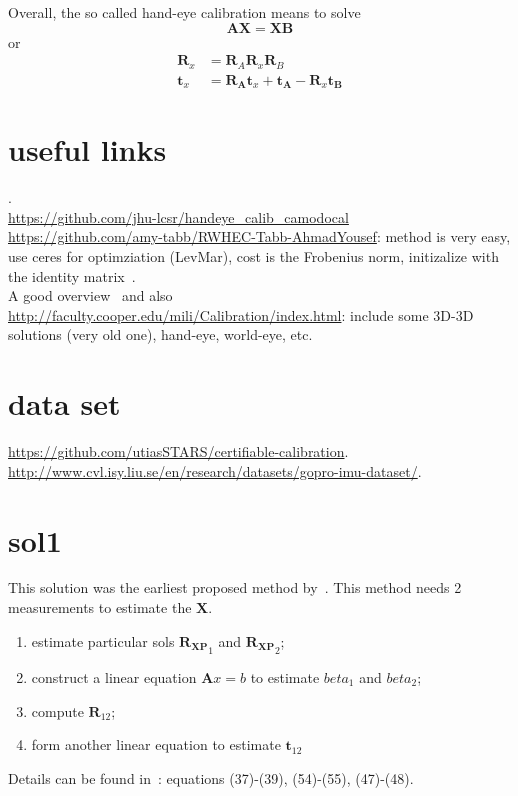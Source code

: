 \documentclass[a4paper]{report}
\begin{document}
Overall, the so called hand-eye calibration means to solve 
\begin{equation}
\mathbf{AX=XB}
\end{equation} or 
\begin{align}
\mathbf{R}_x&=\mathbf{R}_A\mathbf{R}_x\mathbf{R}_B \\ 
\mathbf{t}_x&=\mathbf{R_A}\mathbf{t}_x+\mathbf{t_A}-\mathbf{R}_x\mathbf{t_B}
\end{align}

\section{useful links}
\cite{tum_hand_eye}.\\
\url{https://github.com/jhu-lcsr/handeye_calib_camodocal}\\
\url{https://github.com/amy-tabb/RWHEC-Tabb-AhmadYousef}: method is very easy, use ceres for optimziation (LevMar), cost is the Frobenius norm, initizalize with the identity matrix~\cite{tabb2017solving}.\\
A good overview~\cite{shah2012overview} and also \url{http://faculty.cooper.edu/mili/Calibration/index.html}: include some 3D-3D solutions (very old one), hand-eye, world-eye, etc.

\section{data set}
\url{https://github.com/utiasSTARS/certifiable-calibration}.\\ 
\url{http://www.cvl.isy.liu.se/en/research/datasets/gopro-imu-dataset/}.



\section{sol1}
This solution was the earliest proposed method by~\cite{shiu1989calibration}. This method needs 2 measurements to estimate the $\mathbf{X}$. 
\begin{enumerate}
\item estimate particular sols $\mathbf{R_{XP}}_1$ and $\mathbf{R_{XP}}_2$;
\item construct a linear equation $\mathbf{A}x=b$ to estimate $beta_1$ and $beta_2$;
\item compute $\mathbf{R}_{12}$;
\item form another linear equation to estimate $\mathbf{t}_{12}$
\end{enumerate}
Details can be found in~\cite{shiu1989calibration}: equations (37)-(39), (54)-(55), (47)-(48).
\end{document}

